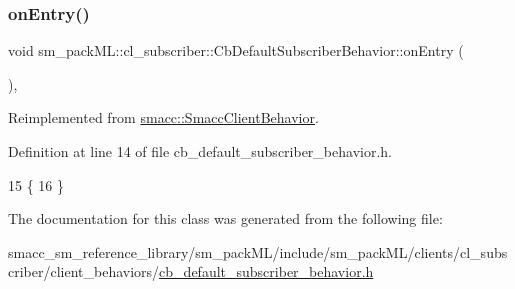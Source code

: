 \subsubsection{\texorpdfstring{on\+Entry()}{onEntry()}}
{\footnotesize\ttfamily void sm\+\_\+pack\+M\+L\+::cl\+\_\+subscriber\+::\+Cb\+Default\+Subscriber\+Behavior\+::on\+Entry (\begin{DoxyParamCaption}{ }\end{DoxyParamCaption})\hspace{0.3cm}{\ttfamily [inline]}, {\ttfamily [virtual]}}



Reimplemented from \hyperlink{classsmacc_1_1SmaccClientBehavior_a7962382f93987c720ad432fef55b123f}{smacc\+::\+Smacc\+Client\+Behavior}.



Definition at line 14 of file cb\+\_\+default\+\_\+subscriber\+\_\+behavior.\+h.


\begin{DoxyCode}
15     \{
16     \}
\end{DoxyCode}


The documentation for this class was generated from the following file\+:\begin{DoxyCompactItemize}
\item 
smacc\+\_\+sm\+\_\+reference\+\_\+library/sm\+\_\+pack\+M\+L/include/sm\+\_\+pack\+M\+L/clients/cl\+\_\+subscriber/client\+\_\+behaviors/\hyperlink{sm__packML_2include_2sm__packML_2clients_2cl__subscriber_2client__behaviors_2cb__default__subscriber__behavior_8h}{cb\+\_\+default\+\_\+subscriber\+\_\+behavior.\+h}\end{DoxyCompactItemize}
